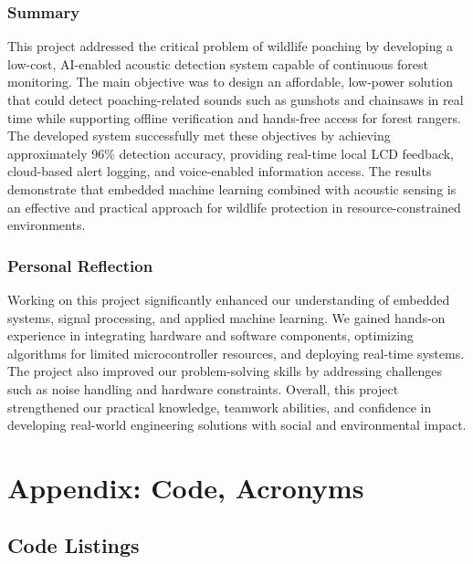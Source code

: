 \documentclass[11pt,a4paper,oneside]{report}
\begin{document}
\subsection{Summary}
This project addressed the critical problem of wildlife poaching by developing a low-cost, AI-enabled acoustic detection system capable of continuous forest monitoring. The main objective was to design an affordable, low-power solution that could detect poaching-related sounds such as gunshots and chainsaws in real time while supporting offline verification and hands-free access for forest rangers. The developed system successfully met these objectives by achieving approximately 96\% detection accuracy, providing real-time local LCD feedback, cloud-based alert logging, and voice-enabled information access. The results demonstrate that embedded machine learning combined with acoustic sensing is an effective and practical approach for wildlife protection in resource-constrained environments.

\subsection{Personal Reflection}
Working on this project significantly enhanced our understanding of embedded systems, signal processing, and applied machine learning. We gained hands-on experience in integrating hardware and software components, optimizing algorithms for limited microcontroller resources, and deploying real-time systems. The project also improved our problem-solving skills by addressing challenges such as noise handling and hardware constraints. Overall, this project strengthened our practical knowledge, teamwork abilities, and confidence in developing real-world engineering solutions with social and environmental impact.


\chapter*{Appendix: Code, Acronyms}

\section*{Code Listings}
\end{document}
